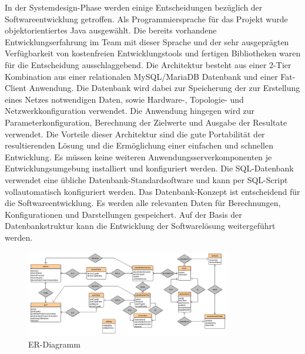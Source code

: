 \documentclass[12pt,titlepage]{article}
\begin{document}
In der Systemdesign-Phase werden einige Entscheidungen bezüglich der Softwareentwicklung getroffen. Als Programmiersprache für das Projekt wurde objektorientiertes Java ausgewählt. Die bereits vorhandene Entwicklungserfahrung im Team mit dieser Sprache und der sehr ausgeprägten Verfügbarkeit von kostenfreien Entwicklungstools und fertigen Bibliotheken waren für die Entscheidung ausschlaggebend.
Die Architektur besteht aus einer 2-Tier Kombination aus einer relationalen MySQL/MariaDB Datenbank und einer Fat-Client Anwendung. Die Datenbank wird dabei zur Speicherung der zur Erstellung eines Netzes notwendigen Daten, sowie Hardware-, Topologie- und Netzwerkkonfiguration verwendet. Die Anwendung hingegen wird zur Parameterkonfiguration, Berechnung der Zielwerte und Ausgabe der Resultate verwendet.
Die Vorteile dieser Architektur sind die gute Portabilität der resultierenden Lösung und die Ermöglichung einer einfachen und schnellen Entwicklung. Es müssen keine weiteren Anwendungsserverkomponenten je Entwicklungsumgebung installiert und konfiguriert werden. Die SQL-Datenbank verwendet eine übliche Datenbank-Standardsoftware und kann per SQL-Script vollautomatisch konfiguriert werden.
Das Datenbank-Konzept ist entscheidend für die Softwareentwicklung. Es werden alle relevanten Daten für Berechnungen, Konfigurationen und Darstellungen gespeichert. Auf der Basis der Datenbankstruktur kann die Entwicklung der Softwarelösung weitergeführt werden.


\begin{figure}[!]
	\centering
	\includegraphics[width=0.8\textwidth]{MethSoftwareER}
	\caption{ER-Diagramm} %
	\label{fig:MethSoftwareER}
\end{figure}
\end{document}
